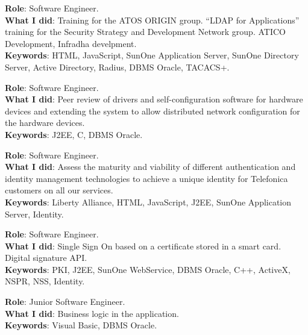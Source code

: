 \documentclass[]{resume}
\begin{document}
\begin{minipage}[t]{0.66\textwidth}

\textbf{Role}: Software Engineer.\\
\textbf{What I did}: Training for the ATOS ORIGIN group. ``LDAP for Applications'' training for the Security Strategy and Development Network group. ATICO Development, Infradha develpment.\\
\textbf{Keywords}: HTML, JavaScript, SunOne Application Server, SunOne Directory Server, Active Directory, Radius, DBMS Oracle, TACACS+.
\sectionsep

\descript{|}
\textbf{Role}: Software Engineer.\\
\textbf{What I did}: Peer review of drivers and self-configuration software for hardware devices and extending the system to allow distributed network configuration for the hardware devices.\\
\textbf{Keywords}: J2EE, C, DBMS Oracle.
\sectionsep

\textbf{Role}: Software Engineer.\\
\textbf{What I did}: Assess the maturity and viability of different authentication and identity management technologies to achieve a unique identity for Telefonica customers on all our services.\\
\textbf{Keywords}: Liberty Alliance, HTML, JavaScript, J2EE, SunOne Application Server, Identity.
\sectionsep

\textbf{Role}: Software Engineer.\\
\textbf{What I did}: Single Sign On based on a certificate stored in a smart card. Digital signature API.\\
\textbf{Keywords}: PKI, J2EE, SunOne WebService, DBMS Oracle, C++, ActiveX, NSPR, NSS, Identity.
\sectionsep

\textbf{Role}: Junior Software Engineer.\\
\textbf{What I did}: Business logic in the application.\\
\textbf{Keywords}: Visual Basic, DBMS Oracle.
\sectionsep

\end{minipage}
\end{document}
